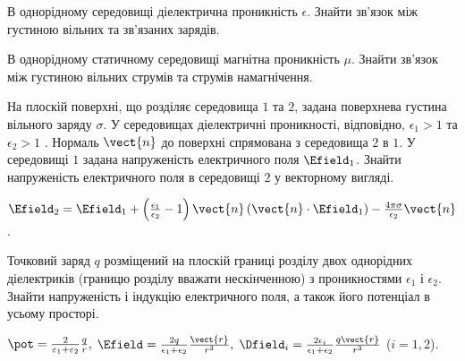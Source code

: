 \begin{problem}%
В однорідному середовищі діелектрична проникність  $\epsilon$. Знайти зв’язок між густиною вільних та зв’язаних зарядів.
\end{problem}

\begin{problem}%
В однорідному статичному середовищі магнітна проникність $\mu$. Знайти зв’язок між густиною вільних струмів та струмів намагнічення.
\end{problem}



\begin{problem}
    На плоскій поверхні, що розділяє середовища $1$ та $2$, задана поверхнева густина вільного заряду $\sigma$. У середовищах діелектричні проникності, відповідно, $\epsilon_1 > 1$ та $\epsilon_2 > 1$ . Нормаль $\vect{n}$ до поверхні спрямована з середовища $2$ в $1$. У середовищі $1$ задана напруженість електричного поля $\Efield_1$. Знайти напруженість електричного поля в середовищі $2$ у векторному вигляді.
\begin{solution}
    $\Efield_2 = \Efield_1 + \left( \frac{\epsilon_1}{\epsilon _2} - 1 \right)\vect{n}\left( \vect{n} \cdot \Efield_1 \right) - \frac{4\pi \sigma }{\epsilon _2}{\vect{n}}$.
\end{solution}
\end{problem}

\begin{problem}
Точковий заряд $q$ розміщений на плоскій границі розділу двох однорідних  діелектриків (границю розділу вважати нескінченною) з проникностями $\epsilon_{1}$ і $\epsilon_{2}$. Знайти напруженість і індукцію електричного поля, а також його потенціал в усьому просторі.
\begin{solution}
	$
		\pot  = \frac{2}{{{\varepsilon _1} + {\varepsilon _2}}}\frac{q}{r},
	$
	$
		\Efield = \frac{2q}{\epsilon_1 + \epsilon_2}\frac{\vect{r}}{r^3},
	$
	$ \Dfield_i = \frac{2\epsilon_i}{\epsilon_1 + \epsilon_2}\frac{q\vect{r}}{r^3} $ ($i = 1,2$).
\end{solution}
\end{problem}


